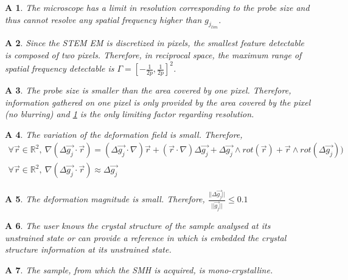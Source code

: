\documentclass[12pt]{article}
\newtheorem{A}{A}
\begin{document}
\begin{A}
\normalfont The microscope has a limit in resolution corresponding to the probe size and thus cannot resolve any spatial frequency higher than $g_{j_{lim}}$. 
\label{A_1}
\end{A}
\begin{A}
\normalfont Since the STEM EM is discretized in pixels, the smallest feature detectable is composed of two pixels. Therefore, in reciprocal space, the maximum range of spatial frequency detectable is $\Gamma=[-\frac{1}{2p},\frac{1}{2p}]^{2}$.
\label{A_2}
\end{A}
\begin{A}
\normalfont The probe size is smaller than the area covered by one pixel. Therefore, information gathered on one pixel is only provided by the area covered by the pixel (no blurring) and \cref{A_1} is the only limiting factor regarding resolution.
\label{A_3}
\end{A}
\begin{A}
\label{A_4}
\normalfont The variation  of the deformation field is small. Therefore,
\begin{equation*}
\begin{gathered}
\forall \vec{r} \in \mathbb{R}^2, \ \nabla (\Delta\overrightarrow{g_j}\cdot\vec{r})= (\Delta\overrightarrow{g_j}\cdot\nabla)\vec{r}+(\vec{r}\cdot\nabla)\Delta\overrightarrow{g_j}+\Delta\overrightarrow{g_j}\wedge rot(\vec{r})+\vec{r}\wedge rot(\Delta\overrightarrow{g_j}))\\
\forall \vec{r} \in \mathbb{R}^2, \ \nabla (\Delta\overrightarrow{g_j}\cdot\vec{r})\approx \Delta\overrightarrow{g_j}
\end{gathered}
\end{equation*}
\end{A}
\begin{A}
\label{A_5}
\normalfont The deformation magnitude is small. Therefore, $\frac{||\Delta\overrightarrow{g_j} ||}{||\overrightarrow{g_j} ||}\leq 0.1$
\end{A}
\begin{A}
\label{A_6}
\normalfont The user knows the crystal structure of the sample analysed at its unstrained state or can provide a reference in which is embedded the crystal structure information at its unstrained state.
\end{A}
\begin{A}
\label{A_7}
\normalfont The sample, from which the SMH is acquired, is mono-crystalline.
\end{A}
\end{document}
